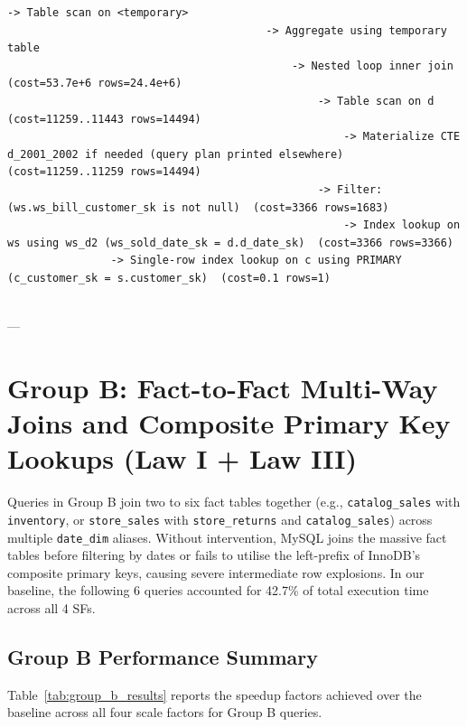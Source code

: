 \documentclass{ULBreport}
\begin{document}
\begin{lstlisting}[caption={Optimized \texttt{EXPLAIN FORMAT=TREE} on SF8 for Query 11}, label={lst:q11_explain_opt}, basicstyle=\ttfamily\scriptsize, breaklines=true, frame=single]
                                    -> Table scan on <temporary>
                                        -> Aggregate using temporary table
                                            -> Nested loop inner join  (cost=53.7e+6 rows=24.4e+6)
                                                -> Table scan on d  (cost=11259..11443 rows=14494)
                                                    -> Materialize CTE d_2001_2002 if needed (query plan printed elsewhere)  (cost=11259..11259 rows=14494)
                                                -> Filter: (ws.ws_bill_customer_sk is not null)  (cost=3366 rows=1683)
                                                    -> Index lookup on ws using ws_d2 (ws_sold_date_sk = d.d_date_sk)  (cost=3366 rows=3366)
                -> Single-row index lookup on c using PRIMARY (c_customer_sk = s.customer_sk)  (cost=0.1 rows=1)


\end{lstlisting}

---

\section{Group B: Fact-to-Fact Multi-Way Joins and Composite Primary Key Lookups (Law I + Law III)}

Queries in Group B join two to six fact tables together (e.g., \texttt{catalog\_sales} with \texttt{inventory}, or \texttt{store\_sales} with \texttt{store\_returns} and \texttt{catalog\_sales}) across multiple \texttt{date\_dim} aliases. Without intervention, MySQL joins the massive fact tables before filtering by dates or fails to utilise the left-prefix of InnoDB's composite primary keys, causing severe intermediate row explosions. In our baseline, the following 6 queries accounted for 42.7\% of total execution time across all 4 SFs.

\subsection{Group B Performance Summary}
Table~\ref{tab:group_b_results} reports the speedup factors achieved over the baseline across all four scale factors for Group B queries.
\end{document}
